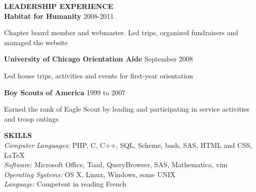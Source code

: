 \documentclass{article}
\begin{document}
\begin{flushleft}
{\bf LEADERSHIP EXPERIENCE}\\
\hspace{20pt}
{\bf Habitat for Humanity} \hfill 2008-2011\\
\vspace{-6pt}
\begin{list}{}{\leftmargin=50pt}\setlength{\itemsep}{-2pt}
\item Chapter board member and webmaster. Led trips, organized fundraisers and managed the website
\end{list}

\hspace{20pt}
{\bf University of Chicago Orientation Aide} \hfill September 2008\\
\vspace{-6pt}
\begin{list}{}{\leftmargin=50pt}\setlength{\itemsep}{-2pt}
\item Led house trips, activities and events for first-year orientation
\end{list}

\hspace{20pt}
{\bf Boy Scouts of America} \hfill 1999 to 2007
\vspace{-6pt}
\begin{list}{}{\leftmargin=50pt}\setlength{\itemsep}{-2pt}
\item Earned the rank of Eagle Scout by leading and participating in service activities and troop outings
\end{list}

{\bf SKILLS}\\
\hspace{20pt}
{\it Computer Languages:} PHP, C, C++, SQL, Scheme, bash, SAS, HTML and CSS, \LaTeX\\
\hspace{20pt}
{\it Software:} Microsoft Office, Toad, QueryBrowser, SAS, Mathematica, vim\\
\hspace{20pt}
{\it Operating Systems:} OS X, Linux, Windows, some UNIX\\
\hspace{20pt}
{\it Language:} Competent in reading French

\end{flushleft}
\end{document}
